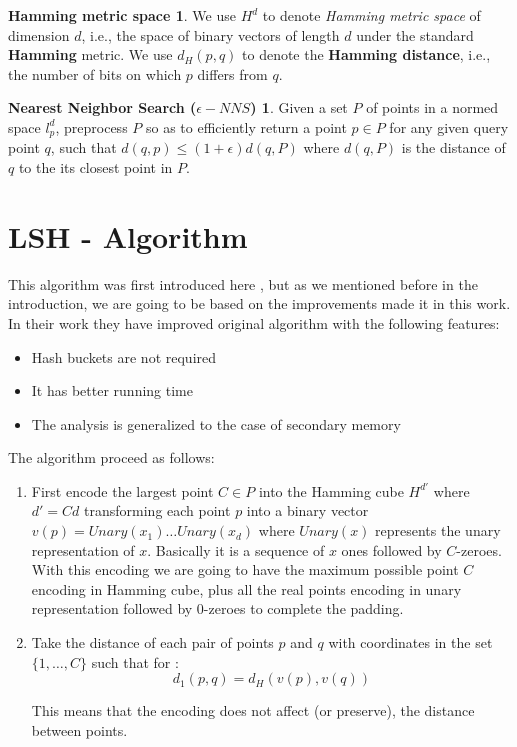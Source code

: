 \documentclass[12pt, a4paper]{article}
\theoremstyle{definition}
\newtheorem*{hamming}{Hamming metric space}
\newtheorem*{nns}{Nearest Neighbor Search ($\epsilon-NNS$)}
\begin{document}
\begin{hamming}
  We use $H^d$ to denote \textit{Hamming metric space} of dimension $d$, i.e., the space of binary vectors of length $d$ under the standard \textbf{Hamming} metric. We use $d_H(p,q)$ to denote the \textbf{Hamming distance}, i.e., the number of bits on which $p$ differs from $q$.
\end{hamming}

\begin{nns}
  Given a set $P$ of points in a normed space $l^{d}_p$, preprocess $P$ so as to efficiently return a point $p \in P$ for any given query point $q$, such that $d(q, p) \leq (1 + \epsilon)d(q,P)$ where $d(q, P)$ is the distance of $q$ to the its closest point
in $P$.
\end{nns}

\section{LSH - Algorithm}
This algorithm was first introduced here \cite{motwani_lsh}, but as we mentioned before in the introduction, we are going to be based on the improvements made it in this \cite{gionis_sim_search} work. In their work they have improved original algorithm with the following features:

\begin{itemize}
  \item Hash buckets are not required
  \item It has better running time
  \item The analysis is generalized to the case of secondary memory
\end{itemize}

The algorithm proceed as follows:

\begin{enumerate}
  \item First encode the largest point $C \in P$ into the Hamming cube $H^{d'}$ where $d' = Cd$ transforming each point $p$ into a binary vector $v(p) = Unary(x_1) \dots Unary(x_d)$ where $Unary(x)$ represents the unary representation of $x$. Basically it is a sequence of $x$ ones followed by $C$-zeroes.
    With this encoding we are going to have the maximum possible point $C$ encoding in Hamming cube, plus all the real points encoding in unary representation followed by $0$-zeroes to complete the padding.
  \item Take the distance of each pair of points $p$ and $q$ with coordinates in the set $\{1,\dots, C\}$ such that for :
    \begin{equation*}
      d_1(p,q) = d_H(v(p), v(q))
    \end{equation*}

    This means that the encoding does not affect (or preserve), the distance between points.
\end{enumerate}
\end{document}
